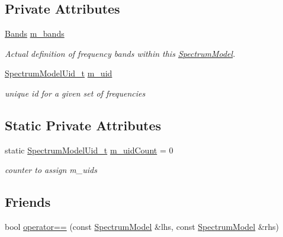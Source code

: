 \subsection*{Private Attributes}
\begin{DoxyCompactItemize}
\item 
\hyperlink{namespacens3_a46ac9188e5cf43bd5292f7b67451246e}{Bands} \hyperlink{classns3_1_1SpectrumModel_afb4f2240520efa617078b88c3959c532}{m\+\_\+bands}
\begin{DoxyCompactList}\small\item\em Actual definition of frequency bands within this \hyperlink{classns3_1_1SpectrumModel}{Spectrum\+Model}. \end{DoxyCompactList}\item 
\hyperlink{namespacens3_a5bf0e89b3407bbb59c90a4d8c4cf0a18}{Spectrum\+Model\+Uid\+\_\+t} \hyperlink{classns3_1_1SpectrumModel_a5220fa3bb9a94a50c6f1aa11fc65b76e}{m\+\_\+uid}
\begin{DoxyCompactList}\small\item\em unique id for a given set of frequencies \end{DoxyCompactList}\end{DoxyCompactItemize}
\subsection*{Static Private Attributes}
\begin{DoxyCompactItemize}
\item 
static \hyperlink{namespacens3_a5bf0e89b3407bbb59c90a4d8c4cf0a18}{Spectrum\+Model\+Uid\+\_\+t} \hyperlink{classns3_1_1SpectrumModel_a25cd21aedfebec21bdee631bb0cebf58}{m\+\_\+uid\+Count} = 0
\begin{DoxyCompactList}\small\item\em counter to assign m\+\_\+uids \end{DoxyCompactList}\end{DoxyCompactItemize}
\subsection*{Friends}
\begin{DoxyCompactItemize}
\item 
bool \hyperlink{classns3_1_1SpectrumModel_a0ed4389afc15bf37ddd2658842aabf29}{operator==} (const \hyperlink{classns3_1_1SpectrumModel}{Spectrum\+Model} \&lhs, const \hyperlink{classns3_1_1SpectrumModel}{Spectrum\+Model} \&rhs)
\end{DoxyCompactItemize}
